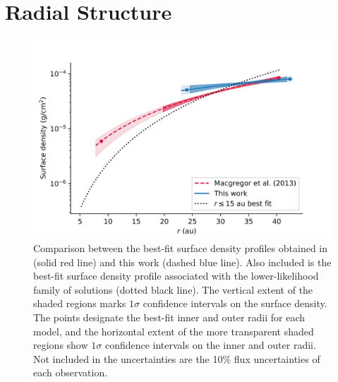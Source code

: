 \documentclass[12pt,oneside]{book}
\begin{document}
\section{Radial Structure}
\label{section: radial discussion}

\begin{figure}[!ht]
  \includegraphics[width=\linewidth]{../figures/surface_density}
  \caption{
    Comparison between the best-fit surface density profiles obtained in \cite{macgregor13} (solid red line) and this work (dashed blue line).
    Also included is the best-fit surface density profile associated with the lower-likelihood family of solutions (dotted black line).
    The vertical extent of the shaded regions marks $1\sigma$ confidence intervals on the surface density. 
    The points designate the best-fit inner and outer radii for each model, and the horizontal extent of the more transparent shaded regions show $1 \sigma$ confidence intervals on the inner and outer radii.
    Not included in the uncertainties are the 10\% flux uncertainties of each observation.
    }
  \label{fig surface_density}
\end{figure}
\end{document}
